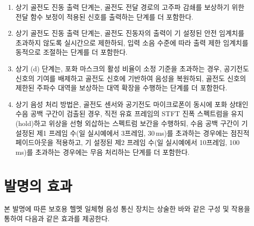 \documentclass{article}
\begin{document}
\begin{enumerate}[label = \textbf{(M.2.\arabic*)}]
    \item 상기 골전도 진동 출력 단계는, 골전도 전달 경로의 고주파 감쇄를 보상하기 위한 전달 함수 보정이 적용된 신호를 출력하는 단계를 더 포함한다.

    \item 상기 골전도 진동 출력 단계는, 골전도 진동자의 출력이 기 설정된 안전 임계치를 초과하지 않도록 실시간으로 제한하되, 입력 소음 수준에 따라 출력 제한 임계치를 동적으로 조절하는 단계를 더 포함한다.

    \item 상기 (d) 단계는, 포화 마스크의 활성 비율이 
    소정 기준을 초과하는 경우, 공기전도 신호의 기여를 
    배제하고 골전도 신호에 기반하여 음성을 복원하되, 
    골전도 신호의 제한된 주파수 대역을 보상하는 대역 
    확장을 수행하는 단계를 더 포함한다.

    \item 상기 음성 처리 방법은, 골전도 센서와 
    공기전도 마이크로폰이 동시에 포화 상태인 수음 
    공백 구간이 검출된 경우, 직전 유효 프레임의 
    STFT 진폭 스펙트럼을 유지(hold)하고 위상을 선형 외삽하는 스펙트럼 보간을 수행하되, 수음 공백 구간이 기 설정된 제1 프레임 수(일 실시예에서 3프레임, 30\,ms)를 초과하는 경우에는 점진적 페이드아웃을 적용하고, 기 설정된 제2 프레임 수(일 실시예에서 10프레임, 100\,ms)를 초과하는 경우에는 무음 처리하는 
    단계를 더 포함한다.

\end{enumerate}

\section{발명의 효과}

본 발명에 따른 보호용 헬멧 일체형 음성 통신 장치는 상술한 바와 같은 
구성 및 작용을 통하여 다음과 같은 효과를 제공한다.
\end{document}
